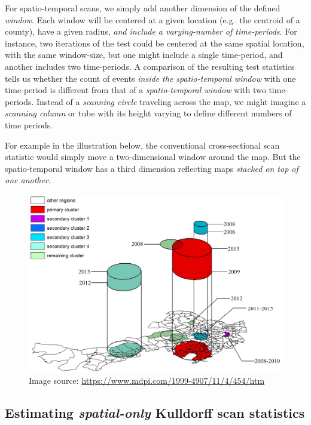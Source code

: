 \documentclass[
]{book}
\begin{document}
For spatio-temporal scans, we simply add another dimension of the defined \emph{window}. Each window will be centered at a given location (e.g.~the centroid of a county), have a given radius, \emph{and include a varying-number of time-periods}. For instance, two iterations of the test could be centered at the same spatial location, with the same window-size, but one might include a single time-period, and another includes two time-periods. A comparison of the resulting test statistics tells us whether the count of events \emph{inside the spatio-temporal window} with one time-period is different from that of a \emph{spatio-temporal window} with two time-periods. Instead of a \emph{scanning circle} traveling across the map, we might imagine a \emph{scanning column} or tube with its height varying to define different numbers of time periods.

For example in the illustration below, the conventional cross-sectional scan statistic would simply move a two-dimensional window around the map. But the spatio-temporal window has a third dimension reflecting maps \emph{stacked on top of one another}.

\begin{figure}
\centering
\includegraphics{images/spatio-temporal-window.png}
\caption{\label{fig:unnamed-chunk-237}Image source: \url{https://www.mdpi.com/1999-4907/11/4/454/htm}}
\end{figure}

\hypertarget{estimating-spatial-only-kulldorff-scan-statistics}{%
\subsection{\texorpdfstring{Estimating \emph{spatial-only} Kulldorff scan statistics}{Estimating spatial-only Kulldorff scan statistics}}\label{estimating-spatial-only-kulldorff-scan-statistics}}
\end{document}
